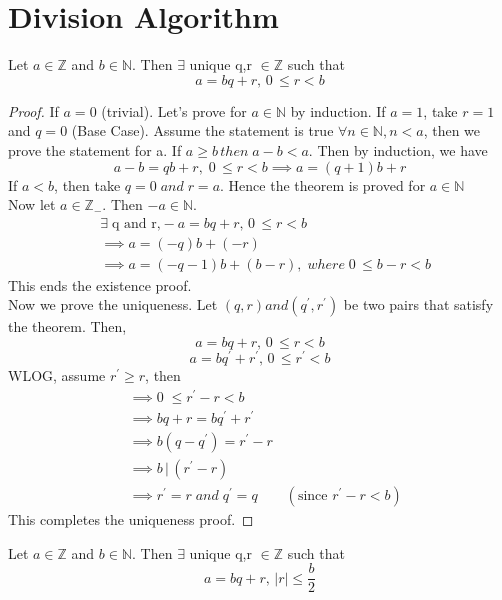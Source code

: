 \documentclass[10pt,a4paper]{article}
\begin{document}
\section*{Division Algorithm}

\begin{theorem}
Let $a \in \mathbb{Z}$ and $b \in \mathbb{N}$. Then $\exists$ unique q,r $\in \mathbb{Z}$ such that $$a=bq+r,\, 0\,{\le}r<b$$
\end{theorem}

\begin{proof}
If $a=0$ (trivial). Let's prove for $a \in \mathbb{N}$ by induction. 
If $a = 1$, take $r = 1$ and $q = 0$ (Base Case).
Assume the statement is true $\forall n \in \mathbb{N}, n < a$, then we prove the statement for a. 
If $a \ge b\, then\; a-b<a$. 
Then by induction, we have $$a-b = qb+r, \; 0\, \le r <b \implies a = (q+1)b+r$$
If $a<b$, then take $q = 0 \;and\;r=a$. Hence the theorem is proved for $a\in \mathbb{N}$ \\
Now let $a\in \mathbb{Z}_{-}$. Then $-a\in\mathbb{N}$. 
\begin{align*}
&\exists\; \text{q and r,} -a = bq+r,\,  0\, \le r <b \\
&\implies a = (-q)b + (-r) \\
&\implies a = (-q-1)b + (b-r),\; where\;  0\, \le b- r <b
\end{align*}
This ends the existence proof.\\
Now we prove the uniqueness. Let $(q,r) and (q^{\prime},r^{\prime})$ be two pairs that satisfy the theorem. Then,
$$a=bq+r,\, 0\,{\le}r<b$$
$$a=bq^{\prime}+r^{\prime},\, 0\,{\le}r^{\prime}<b$$
WLOG, assume $r^{\prime}\ge r$, then
\begin{align*}
&\implies 0\;\le r^{\prime}-r<b \\
&\implies bq+r = bq^{\prime}+r^{\prime} \\
&\implies b(q-q^{\prime}) = r^{\prime}-r \\
&\implies b\,|\,(r^{\prime}-r) \\
&\implies r^{\prime}=r \;and\; q^{\prime}=q \qquad(\text{since }r^{\prime}-r<b)
\end{align*}
This completes the uniqueness proof.
\end{proof}

\begin{lemma}
Let $a \in \mathbb{Z}$ and $b \in \mathbb{N}$. Then $\exists$ unique q,r $\in \mathbb{Z}$ such that $$a=bq+r,\, \vert r\vert\le \frac{b}{2}$$
\end{lemma}
\end{document}
